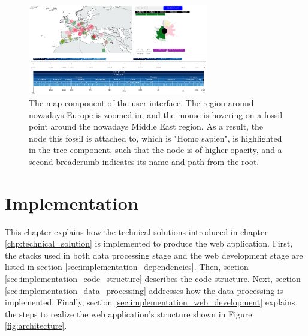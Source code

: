 \documentclass[11pt, a4paper,oneside,chapterprefix=false]{scrbook}
\begin{document}
\begin{figure}[h]
	\centering
	\includegraphics[width=0.7\textwidth]{figures/technical_solution/map}
	\caption{The map component of the user interface. The region around nowadays Europe is zoomed in, and the mouse is hovering on a fossil point around the nowadays Middle East region. As a result, the node this fossil is attached to, which is "Homo sapien", is highlighted in the tree component, such that the node is of higher opacity, and a second breadcrumb indicates its name and path from the root. }
	\label{fig:map}
\end{figure}

\chapter{Implementation} \label{chp:implementation}
This chapter explains how the technical solutions introduced in chapter \ref{chp:technical_solution} is implemented to produce the web application. First, the stacks used in both data processing stage and the web development stage are listed in section \ref{sec:implementation_dependencies}. Then, section \ref{sec:implementation_code_structure} describes the code structure. Next, section \ref{sec:implementation_data_processing} addresses how the data processing is implemented. Finally, section \ref{sec:implementation_web_development} explains the steps to realize the web application's structure shown in Figure \ref{fig:architecture}.
\end{document}
